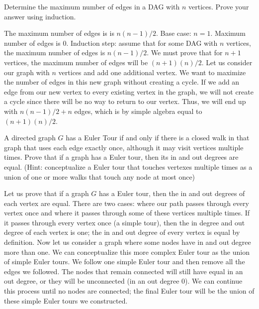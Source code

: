 \documentclass[solution, letterpaper]{cs20}
\begin{document}



\subproblem Determine the maximum number of edges in a DAG with $n$ vertices.
\subproblem Prove your answer using induction.  

\begin{solution}
\subsolution The maximum number of edges is is $n(n-1)/2$. 
\subsolution Base case: $n = 1$. Maximum number of edges is 0. 
Induction step: assume that for some DAG with $n$ vertices, the maximum number of edges is $n(n-1)/2$. We must prove that for $n+1$ vertices, the maximum number of edges will be $(n+1)(n)/2$. Let us consider our graph with $n$ vertices and add one additional vertex.  We want to maximize the number of edges in this new graph without creating a cycle. If we add an edge from our new vertex to every existing vertex in the graph, we will not create a cycle since there will be no way to return to our vertex. Thus, we will end up with $n(n-1)/2 + n$ edges, which is by simple algebra equal to $(n+1)(n)/2$. 
\end{solution}


A directed graph $G$ has a Euler Tour if and only if there is a closed walk in that graph that uses each edge exactly once, although it may visit vertices multiple times. Prove that if a graph has a Euler tour, then its in and out degrees are equal. (Hint: conceptualize a Euler tour that touches vertexes multiple times as a union of one or more walks that touch any node at most once)

\begin{solution}
Let us prove that if a graph $G$ has a Euler tour, then the in and out degrees of each vertex are equal. There are two cases: where our path passes through every vertex once and where it passes through some of these vertices multiple times.
If it passes through every vertex once (a simple tour), then the in degree and out degree of each vertex is one; the in and out degree of every vertex is equal by definition. Now let us consider a graph where some nodes have in and out degree more than one. We can conceptualize this more complex Euler tour as the union of simple Euler tours. We follow one simple Euler tour and then remove all the edges we followed. The nodes that remain connected will still have equal in an out degree, or they will be unconnected (in an out degree 0). We can continue this process until no nodes are connected; the final Euler tour will be the union of these simple Euler tours we constructed. 

\end{solution}
\end{document}
